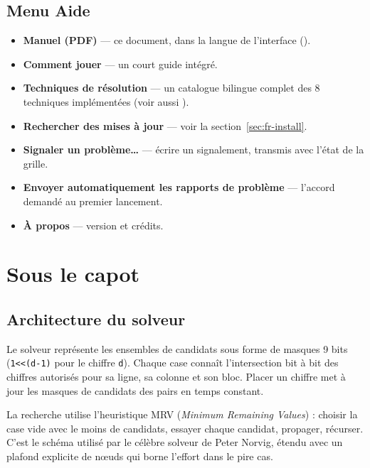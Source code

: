 \subsection{Menu Aide}

\begin{itemize}
  \item \textbf{Manuel (PDF)} --- ce document, dans la langue de l'interface ().
  \item \textbf{Comment jouer} --- un court guide intégré.
  \item \textbf{Techniques de résolution} --- un catalogue bilingue complet des
        8 techniques implémentées (voir aussi ).
  \item \textbf{Rechercher des mises à jour} --- voir la section~\ref{sec:fr-install}.
  \item \textbf{Signaler un problème\dots} --- écrire un signalement, transmis avec l'état de la grille.
  \item \textbf{Envoyer automatiquement les rapports de problème} --- l'accord demandé au premier lancement.
  \item \textbf{À propos} --- version et crédits.
\end{itemize}

\section{Sous le capot}

\subsection{Architecture du solveur}

Le solveur représente les ensembles de candidats sous forme de masques
9 bits (\texttt{1<<(d-1)} pour le chiffre \texttt{d}). Chaque case
connaît l'intersection bit à bit des chiffres autorisés pour sa ligne,
sa colonne et son bloc. Placer un chiffre met à jour les masques de
candidats des pairs en temps constant.

La recherche utilise l'heuristique MRV (\emph{Minimum Remaining
Values}) : choisir la case vide avec le moins de candidats, essayer
chaque candidat, propager, récurser. C'est le schéma utilisé par le
célèbre solveur de Peter Norvig, étendu avec un plafond explicite de
n\oe uds qui borne l'effort dans le pire cas.


